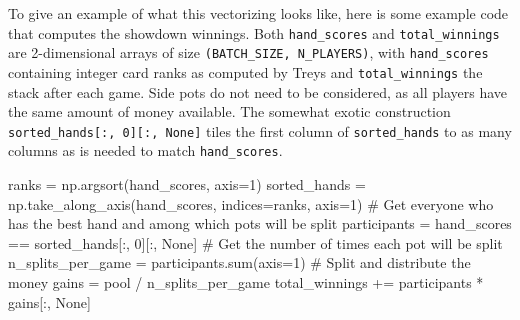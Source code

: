 To give an example of what this vectorizing looks like, here is some example code that computes the showdown winnings. Both \verb{hand_scores{ and \verb{total_winnings{ are 2-dimensional arrays of size \verb{(BATCH_SIZE, N_PLAYERS){, with \verb{hand_scores{ containing integer card ranks as computed by Treys and \verb{total_winnings{ the stack after each game. Side pots do not need to be considered, as all players have the same amount of money available. The somewhat exotic construction \verb{sorted_hands[:, 0][:, None]{ tiles the first column of \verb{sorted_hands{ to as many columns as is needed to match \verb{hand_scores{.
\begin{code}
ranks = np.argsort(hand_scores, axis=1)
sorted_hands = np.take_along_axis(hand_scores, indices=ranks, axis=1)
# Get everyone who has the best hand and among which pots will be split
participants = hand_scores == sorted_hands[:, 0][:, None]
# Get the number of times each pot will be split
n_splits_per_game = participants.sum(axis=1)
# Split and distribute the money
gains = pool / n_splits_per_game
total_winnings += participants * gains[:, None]
\end{code}

